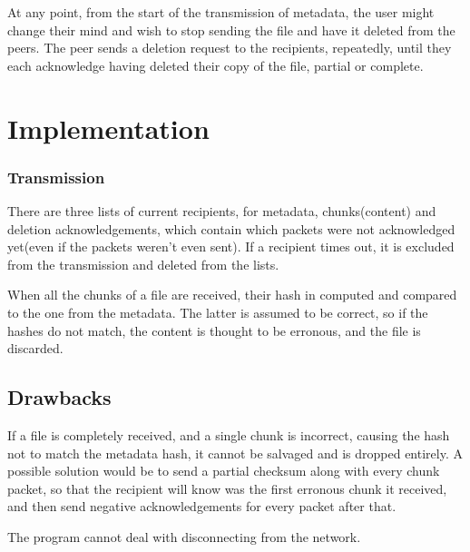 \documentclass[a4paper, 12pt]{report}
\begin{document}
At any point, from the start of the transmission of metadata, the user might change their mind and wish to stop sending the file and have it deleted from the peers. The peer sends a deletion request to the recipients, repeatedly, until they each acknowledge having deleted their copy of the file, partial or complete.

\section{Implementation}

\subsubsection{Transmission}
There are three lists of current recipients, for metadata, chunks(content) and deletion acknowledgements, which contain which packets were not acknowledged yet(even if the packets weren't even sent). If a recipient times out, it is excluded from the transmission and deleted from the lists.

When all the chunks of a file are received, their hash in computed and compared to the one from the metadata. The latter is assumed to be correct, so if the hashes do not match, the content is thought to be erronous, and the file is discarded.

\subsection{Drawbacks}
If a file is completely received, and a single chunk is incorrect, causing the hash not to match the metadata hash, it cannot be salvaged and is dropped entirely. A possible solution would be to send a partial checksum along with every chunk packet, so that the recipient will know was the first erronous chunk it received, and then send negative acknowledgements for every packet after that.

The program cannot deal with disconnecting from the network.
\end{document}

